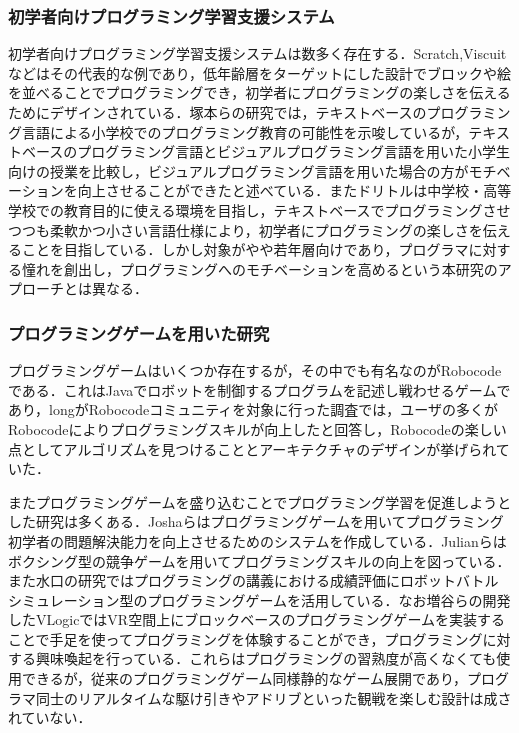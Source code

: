 \subsubsection{初学者向けプログラミング学習支援システム}
初学者向けプログラミング学習支援システムは数多く存在する．Scratch\cite{scratch},Viscuit\cite{viscuit}などはその代表的な例であり，低年齢層をターゲットにした設計でブロックや絵を並べることでプログラミングでき，初学者にプログラミングの楽しさを伝えるためにデザインされている．塚本らの研究では，テキストベースのプログラミング言語による小学校でのプログラミング教育の可能性を示唆しているが，テキストベースのプログラミング言語とビジュアルプログラミング言語を用いた小学生向けの授業を比較し，ビジュアルプログラミング言語を用いた場合の方がモチベーションを向上させることができたと述べている．\cite{tpl,tsukamoto}またドリトル\cite{dolittle}は中学校・高等学校での教育目的に使える環境を目指し，テキストベースでプログラミングさせつつも柔軟かつ小さい言語仕様により，初学者にプログラミングの楽しさを伝えることを目指している．しかし対象がやや若年層向けであり，プログラマに対する憧れを創出し，プログラミングへのモチベーションを高めるという本研究のアプローチとは異なる．

\subsubsection{プログラミングゲームを用いた研究}
プログラミングゲームはいくつか存在するが，その中でも有名なのがRobocodeである．これはJavaでロボットを制御するプログラムを記述し戦わせるゲームであり，longがRobocodeコミュニティを対象に行った調査\cite{long}では，ユーザの多くがRobocodeによりプログラミングスキルが向上したと回答し，Robocodeの楽しい点としてアルゴリズムを見つけることとアーキテクチャのデザインが挙げられていた．

またプログラミングゲームを盛り込むことでプログラミング学習を促進しようとした研究は多くある．Joshaらはプログラミングゲームを用いてプログラミング初学者の問題解決能力を向上させるためのシステムを作成している\cite{joshua}．Julianらはボクシング型の競争ゲームを用いてプログラミングスキルの向上を図っている\cite{julian}．また水口の研究ではプログラミングの講義における成績評価にロボットバトルシミュレーション型のプログラミングゲームを活用している\cite{minakuchi}．なお増谷らの開発したVLogic\cite{mashitani}ではVR空間上にブロックベースのプログラミングゲームを実装することで手足を使ってプログラミングを体験することができ，プログラミングに対する興味喚起を行っている．これらはプログラミングの習熟度が高くなくても使用できるが，従来のプログラミングゲーム同様静的なゲーム展開であり，プログラマ同士のリアルタイムな駆け引きやアドリブといった観戦を楽しむ設計は成されていない．


